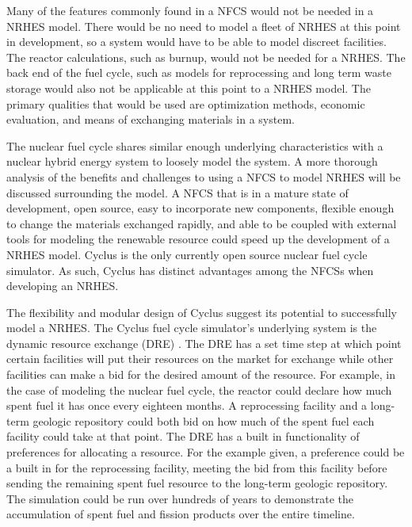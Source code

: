 \documentclass[12pt]{UIdahoMastersThesis}
\begin{document}
Many of the features commonly found in a NFCS would not be needed in a NRHES model.  There would be no need to model a fleet of NRHES at this point in development, so a system would have to be able to model discreet facilities.  The reactor calculations, such as burnup, would not be needed for a NRHES.  The back end of the fuel cycle, such as models for reprocessing and long term waste storage would also not be applicable at this point to a NRHES model.  The primary qualities that would be used are optimization methods, economic evaluation, and means of exchanging materials in a system.

The nuclear fuel cycle shares similar enough underlying characteristics with a nuclear hybrid energy system to loosely model the system.  A more thorough analysis of the benefits and challenges to using a NFCS to model NRHES will be discussed surrounding the model. A NFCS that is in a mature state of development, open source, easy to incorporate new components, flexible enough to change the materials exchanged rapidly, and able to be coupled with external tools for modeling the renewable resource could speed up the development of a NRHES model. Cyclus is the only currently open source nuclear fuel cycle simulator.  As such, Cyclus has distinct advantages among the NFCSs when developing an NRHES.


The flexibility and modular design of Cyclus suggest its potential to successfully model a NRHES. The Cyclus fuel cycle simulator's underlying system is the dynamic resource exchange (DRE) \cite{Huff2016}.  The DRE has a set time step at which point certain facilities will put their resources on the market for exchange while other facilities can make a bid for the desired amount of the resource. For example, in the case of modeling the nuclear fuel cycle, the reactor could declare how much spent fuel it has once every eighteen months.  A reprocessing facility and a long-term geologic repository could both bid on how much of the spent fuel each facility could take at that point.  The DRE has a built in functionality of preferences for allocating a resource.  For the example given, a preference could be a built in for the reprocessing facility, meeting the bid from this facility before sending the remaining spent fuel resource to the long-term geologic repository. The simulation could be run over hundreds of years to demonstrate the accumulation of spent fuel and fission products over the entire timeline.
\end{document}

